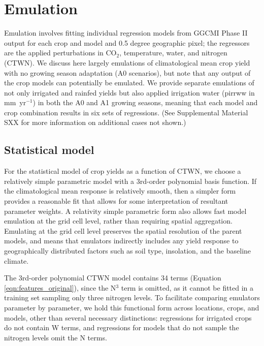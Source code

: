 \documentclass[gmd, manuscript]{copernicus} %
\begin{document}
\section{Emulation}
\label{S:3}
Emulation involves fitting individual regression models from GGCMI Phase II output for each crop and model and 0.5 degree geographic pixel; the regressors are the applied perturbations in CO$_2$, temperature, water, and nitrogen (CTWN). 
We discuss here largely emulations of climatological mean crop yield with no growing season adaptation (A0 scenarios), but note that any output of the crop models can potentially be emulated. 
We provide separate emulations of not only irrigated and rainfed yields but also applied irrigation water (pirrww in mm\ yr$^{-1}$) in both the A0 and A1 growing seasons, meaning that each model and crop combination results in six sets of regressions. (See Supplemental Material SXX for more information on additional cases not shown.)

\subsection{Statistical model}
For the statistical model of crop yields as a function of CTWN, we choose a relatively simple parametric model with a 3rd-order polynomial basis function. 
If the climatological mean response is relatively smooth, then a simpler form provides a reasonable fit that allows for some interpretation of resultant parameter weights. 
A relativity simple parametric form also allows fast model emulation at the grid cell level, rather than requiring spatial aggregation. 
Emulating at the grid cell level preserves the spatial resolution of the parent models, and means that emulators indirectly includes any yield response to geographically distributed factors such as soil type, insolation, and the baseline climate.

The 3rd-order polynomial CTWN model contains 34 terms (Equation \ref{eqn:features_original}), since the N$^3$ term is omitted, as it cannot be fitted in a training set sampling only three nitrogen levels.  To facilitate comparing emulators parameter by parameter, we hold this functional form across locations, crops, and models, other than several necessary distinctions: regressions for irrigated crops do not contain W terms, and regressions for models that do not sample the nitrogen levels omit the N terms. 
\end{document}
